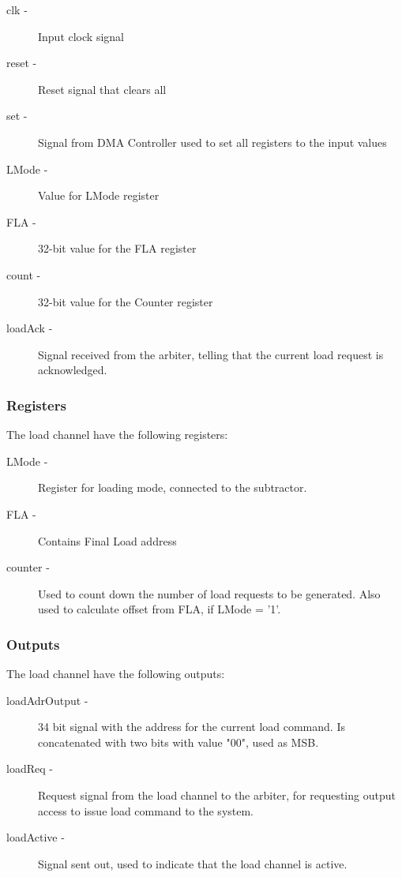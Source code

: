 \begin{appendix}
\begin{description}
    \item[clk -]
    Input clock signal
    \item[reset -]
    Reset signal that clears all 
    \item[set - ]
    Signal from DMA Controller used to set all registers to the input values
    \item[LMode -]
    Value for LMode register
    \item[FLA -]
    32-bit value for the FLA register
    \item[count -]
    32-bit value for the Counter register
    \item[loadAck -]
    Signal received from the arbiter, telling that the current load request is acknowledged.
\end{description}

\subsubsection{Registers}
The load channel have the following registers:

\begin{description}
    \item[LMode -]
    Register for loading mode, connected to the subtractor.
    \item[FLA -]
    Contains Final Load address
    \item[counter -]
    Used to count down the number of load requests to be generated. Also used to calculate offset from FLA, if LMode = '1'.
\end{description}

\subsubsection{Outputs}
The load channel have the following outputs:

\begin{description}
    \item[loadAdrOutput -]
    34 bit signal with the address for the current load command. Is concatenated with two bits with value "00", used as MSB.
    \item[loadReq -]
    Request signal from the load channel to the arbiter, for requesting output access to issue load command to the system.   
    \item[loadActive -]
    Signal sent out, used to indicate that the load channel is active.
\end{description}


\end{appendix}
